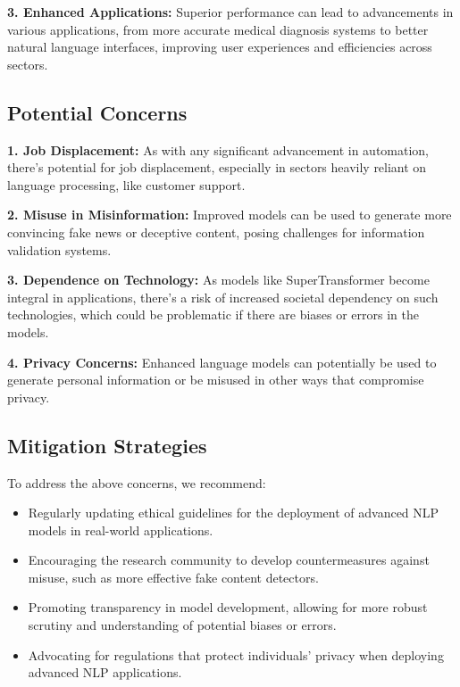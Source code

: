 \documentclass{article}
\begin{document}
\textbf{3. Enhanced Applications:} Superior performance can lead to advancements in various applications, from more accurate medical diagnosis systems to better natural language interfaces, improving user experiences and efficiencies across sectors.

\subsection*{Potential Concerns}

\textbf{1. Job Displacement:} As with any significant advancement in automation, there's potential for job displacement, especially in sectors heavily reliant on language processing, like customer support.

\textbf{2. Misuse in Misinformation:} Improved models can be used to generate more convincing fake news or deceptive content, posing challenges for information validation systems.

\textbf{3. Dependence on Technology:} As models like SuperTransformer become integral in applications, there's a risk of increased societal dependency on such technologies, which could be problematic if there are biases or errors in the models.

\textbf{4. Privacy Concerns:} Enhanced language models can potentially be used to generate personal information or be misused in other ways that compromise privacy.

\subsection*{Mitigation Strategies}

To address the above concerns, we recommend:

\begin{itemize}
    \item Regularly updating ethical guidelines for the deployment of advanced NLP models in real-world applications.
    \item Encouraging the research community to develop countermeasures against misuse, such as more effective fake content detectors.
    \item Promoting transparency in model development, allowing for more robust scrutiny and understanding of potential biases or errors.
    \item Advocating for regulations that protect individuals' privacy when deploying advanced NLP applications.
\end{itemize}
\end{document}
